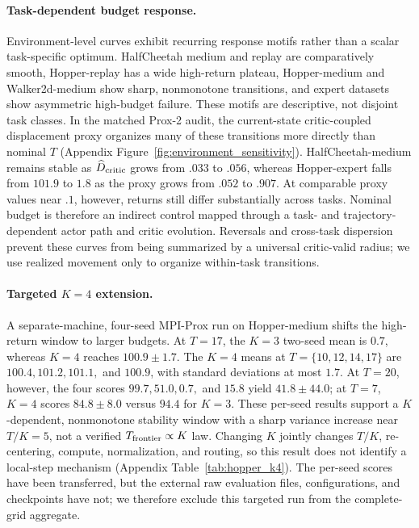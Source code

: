 \paragraph{Task-dependent budget response.}
Environment-level curves exhibit recurring response motifs rather than a
scalar task-specific optimum. HalfCheetah medium and replay are comparatively
smooth, Hopper-replay has a wide high-return plateau, Hopper-medium and
Walker2d-medium show sharp, nonmonotone transitions, and expert
datasets show asymmetric high-budget failure. These motifs are descriptive,
not disjoint task classes.
In the matched Prox-2 audit, the current-state critic-coupled displacement
proxy organizes many of these transitions more directly than nominal $T$
(Appendix Figure~\ref{fig:environment_sensitivity}). HalfCheetah-medium remains
stable as $\widehat D_{\rm critic}$ grows from $.033$ to $.056$, whereas
Hopper-expert falls from $101.9$ to $1.8$ as the proxy grows from $.052$ to
$.907$. At comparable proxy values near $.1$, however, returns still differ
substantially across tasks. Nominal budget is therefore an indirect control
mapped through a task- and trajectory-dependent actor path and critic
evolution. Reversals and cross-task dispersion prevent these curves from being
summarized by a universal critic-valid radius; we use realized movement only
to organize within-task transitions.

\paragraph{Targeted $K=4$ extension.}
A separate-machine, four-seed MPI-Prox run on Hopper-medium shifts the high-return window to larger budgets. At $T=17$, the $K=3$ two-seed mean is $0.7$, whereas $K=4$ reaches $100.9\pm1.7$. The $K=4$ means at $T=\{10,12,14,17\}$ are $100.4,101.2,101.1,$ and $100.9$, with standard deviations at most $1.7$. At $T=20$, however, the four scores $99.7,51.0,0.7,$ and $15.8$ yield $41.8\pm44.0$; at $T=7$, $K=4$ scores $84.8\pm8.0$ versus $94.4$ for $K=3$. These per-seed results support a $K$-dependent, nonmonotone stability window with a sharp variance increase near $T/K=5$, not a verified $T_{\rm frontier}\propto K$ law. Changing $K$ jointly changes $T/K$, re-centering, compute, normalization, and routing, so this result does not identify a local-step mechanism (Appendix Table~\ref{tab:hopper_k4}). The per-seed scores have been transferred, but the external raw evaluation files, configurations, and checkpoints have not; we therefore exclude this targeted run from the complete-grid aggregate.

